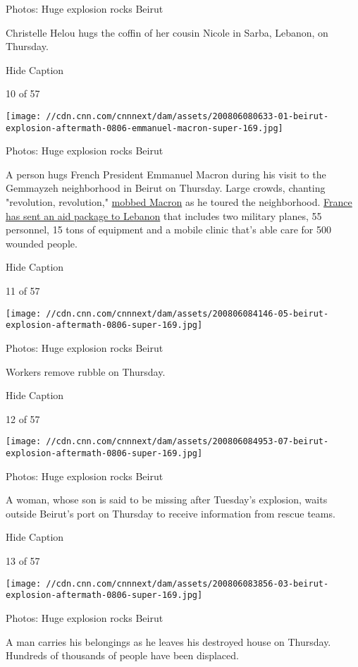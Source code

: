 Photos: Huge explosion rocks Beirut

Christelle Helou hugs the coffin of her cousin Nicole in Sarba, Lebanon,
on Thursday.

Hide Caption

10 of 57

\texttt{[image: //cdn.cnn.com/cnnnext/dam/assets/200806080633-01-beirut-explosion-aftermath-0806-emmanuel-macron-super-169.jpg]}

Photos: Huge explosion rocks Beirut

A person hugs French President Emmanuel Macron during his visit to the
Gemmayzeh neighborhood in Beirut on Thursday. Large crowds, chanting
"revolution, revolution,"
\href{https://www.cnn.com/2020/08/06/middleeast/beirut-explosion-anger-intl-hnk/index.html}{mobbed
Macron} as he toured the neighborhood.
\href{https://www.cnn.com/middleeast/live-news/beirut-lebanon-explosion-08-06-2020/h_8e4d94733d3dd5c37c7d0cc1c364fb8c}{France
has sent an aid package to Lebanon} that includes two military planes,
55 personnel, 15 tons of equipment and a mobile clinic that's able care
for 500 wounded people.

Hide Caption

11 of 57

\texttt{[image: //cdn.cnn.com/cnnnext/dam/assets/200806084146-05-beirut-explosion-aftermath-0806-super-169.jpg]}

Photos: Huge explosion rocks Beirut

Workers remove rubble on Thursday.

Hide Caption

12 of 57

\texttt{[image: //cdn.cnn.com/cnnnext/dam/assets/200806084953-07-beirut-explosion-aftermath-0806-super-169.jpg]}

Photos: Huge explosion rocks Beirut

A woman, whose son is said to be missing after Tuesday's explosion,
waits outside Beirut's port on Thursday to receive information from
rescue teams.

Hide Caption

13 of 57

\texttt{[image: //cdn.cnn.com/cnnnext/dam/assets/200806083856-03-beirut-explosion-aftermath-0806-super-169.jpg]}

Photos: Huge explosion rocks Beirut

A man carries his belongings as he leaves his destroyed house on
Thursday. Hundreds of thousands of people have been displaced.

